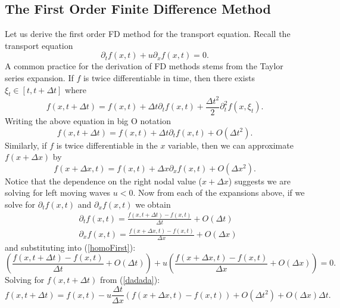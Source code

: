 \subsection{The First Order Finite Difference Method}
Let us derive the first order FD method for the transport equation. Recall the transport equation
%
\begin{equation}
\label{homoFirst}
\partial_t f(x,t) + u \partial_x f(x,t) = 0.
\end{equation}
%
A common practice for the derivation of FD methods stems from the Taylor series expansion. If $f$ is twice differentiable in time, then there exists $\xi_t \in [t,t+\Delta t]$ where
%
\begin{equation*}
f(x,t+\Delta t) = f(x,t) + \Delta t \partial_t f(x,t) + \frac{\Delta t^2}{2} \partial_t^2 f(x,\xi_t).
\end{equation*}
%
Writing the above equation in big O notation
%
\begin{equation*}
f(x,t+\Delta t) = f(x,t) + \Delta t \partial_t f(x,t) + O(\Delta t^2).
\end{equation*}
%
Similarly, if $f$ is twice differentiable in the $x$ variable, then we can approximate $f(x + \Delta x)$ by
%
\begin{equation*}
f(x + \Delta x,t) = f(x,t) + \Delta x \partial_x f(x,t) + O(\Delta x^2).
\end{equation*}
%
Notice that the dependence on the right nodal value ($x + \Delta x$) suggests we are solving for left moving waves $u<0$. Now from each of the expansions above, if we solve for $\partial_t f(x,t)$ and $\partial_x f(x,t)$ we obtain
%
\begin{align*}
&\partial_t f(x,t) = \frac{f(x,t+\Delta t) - f(x,t)}{\Delta t} + O(\Delta t)\\
&\partial_x f(x,t) = \frac{f(x+\Delta x,t) - f(x,t)}{\Delta x} + O(\Delta x)
\end{align*}
%
and substituting into (\ref{homoFirst}):
%
\begin{equation}
\label{dadada}
\left( \frac{f(x,t+\Delta t) - f(x,t)}{\Delta t} + O(\Delta t) \right) + u \left( \frac{f(x+\Delta x,t) - f(x,t)}{\Delta x} + O(\Delta x) \right) = 0.
\end{equation}
%
Solving for $f(x,t+\Delta t)$ from (\ref{dadada}):
%
\begin{equation*}
f(x,t+\Delta t) = f(x,t) - u \frac{\Delta t}{\Delta x} \left(f(x+\Delta x,t) - f(x,t)\right) + O(\Delta t^2) + O(\Delta x) \Delta t.
\end{equation*}
